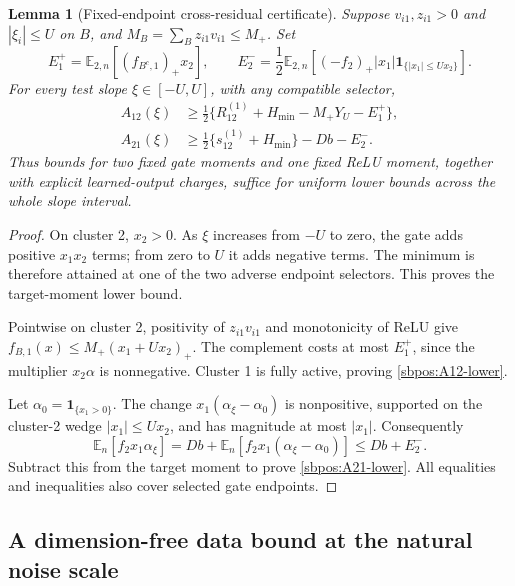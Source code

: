 \documentclass{article} %
\theoremstyle{plain}
\newtheorem{lemma}[theorem]{Lemma}
\theoremstyle{definition}
\theoremstyle{remark}
\begin{document}
\begin{lemma}[Fixed-endpoint cross-residual certificate]
\label{sbpos:endpoints}
Suppose $v_{i1},z_{i1}>0$ and $|\xi_i|\le U$ on $B$, and
$M_B=\sum_Bz_{i1}v_{i1}\le M_+$.
Set
\[
 E_1^+=\mathbb E_{2,n}[(f_{B^c,1})_+x_2],\qquad
 E_2^-=\frac12\mathbb E_{2,n}
 [(-f_2)_+|x_1|\mathbf1_{\{|x_1|\le Ux_2\}}].
\]
For every test slope $\xi\in[-U,U]$, with any compatible selector,
\begin{align}
 A_{12}(\xi)&\ge
 \frac12\{R_{12}^{(1)}+H_{\min}-M_+Y_U-E_1^+\},
 \label{sbpos:A12-lower}\\
 A_{21}(\xi)&\ge
 \frac12\{s_{12}^{(1)}+H_{\min}\}-Db-E_2^-.
 \label{sbpos:A21-lower}
\end{align}
Thus bounds for two fixed gate moments and one fixed ReLU moment,
together with explicit learned-output charges, suffice for uniform lower
bounds across the whole slope interval.
\end{lemma}
\begin{proof}
On cluster 2, $x_2>0$. As $\xi$ increases from $-U$ to zero,
the gate adds positive $x_1x_2$ terms; from zero to $U$ it adds negative
terms. The minimum is therefore attained at one of the two adverse endpoint
selectors. This proves the target-moment lower bound.

Pointwise on cluster 2, positivity of $z_{i1}v_{i1}$ and monotonicity of
ReLU give
$f_{B,1}(x)\le M_+(x_1+Ux_2)_+$.
The complement costs at most $E_1^+$, since the multiplier $x_2\alpha$
is nonnegative. Cluster 1 is fully active, proving
\eqref{sbpos:A12-lower}.

Let $\alpha_0=\mathbf1_{\{x_1>0\}}$.
The change $x_1(\alpha_\xi-\alpha_0)$ is nonpositive, supported on the
cluster-2 wedge $|x_1|\le Ux_2$, and has magnitude at most $|x_1|$.
Consequently
\[
 \mathbb E_n[f_2x_1\alpha_\xi]
 =Db+\mathbb E_n[f_2x_1(\alpha_\xi-\alpha_0)]
 \le Db+E_2^-.
\]
Subtract this from the target moment to prove \eqref{sbpos:A21-lower}.
All equalities and inequalities also cover selected gate endpoints.
\end{proof}

\subsection{A dimension-free data bound at the natural noise scale}
\end{document}
